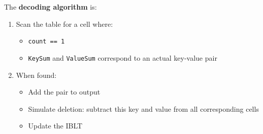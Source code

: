 \highspace
The \textbf{decoding algorithm} is:
\begin{enumerate}
    \item Scan the table for a cell where:
    \begin{itemize}
        \item \texttt{count == 1}
        \item \texttt{KeySum} and \texttt{ValueSum} correspond to an actual key-value pair
    \end{itemize}
    \item When found:
    \begin{itemize}
        \item Add the pair to output
        \item Simulate deletion: subtract this key and value from all corresponding cells
        \item Update the IBLT
    \end{itemize}
\end{enumerate}

\newpage

